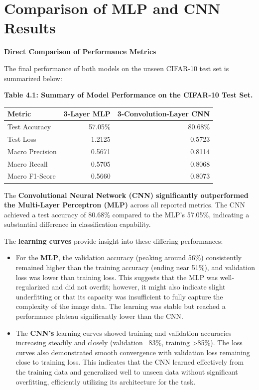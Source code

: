 \documentclass[12pt, a4paper]{report}
\begin{document}
\section{Comparison of MLP and CNN Results}
\noindent \textbf{Direct Comparison of Performance Metrics}

The final performance of both models on the unseen CIFAR-10 test set is summarized below:

\medskip %
\noindent\textbf{Table 4.1: Summary of Model Performance on the CIFAR-10 Test Set.}
\begin{center} %
\begin{tabular}{lrr}
\toprule
Metric & 3-Layer MLP & 3-Convolution-Layer CNN \\
\midrule
Test Accuracy   & 57.05\% & 80.68\% \\
Test Loss       & 1.2125  & 0.5723  \\
Macro Precision & 0.5671  & 0.8114  \\
Macro Recall    & 0.5705  & 0.8068  \\
Macro F1-Score  & 0.5660  & 0.8073  \\
\bottomrule
\end{tabular}
\end{center}
\medskip

The \textbf{Convolutional Neural Network (CNN) significantly outperformed the Multi-Layer Perceptron (MLP)} across all reported metrics.
The CNN achieved a test accuracy of 80.68\% compared to the MLP's 57.05\%, indicating a substantial difference in classification capability.

\noindent The \textbf{learning curves} provide insight into these differing performances:
\begin{itemize}
\item For the \textbf{MLP}, the validation accuracy (peaking around 56\%) consistently remained higher than the training accuracy (ending near 51\%), and validation loss was lower than training loss.
This suggests that the MLP was well-regularized and did not overfit;
however, it might also indicate slight underfitting or that its capacity was insufficient to fully capture the complexity of the image data.
The learning was stable but reached a performance plateau significantly lower than the CNN.

\item The \textbf{CNN's} learning curves showed training and validation accuracies increasing steadily and closely (validation ~83\%, training >85\%).
The loss curves also demonstrated smooth convergence with validation loss remaining close to training loss.
This indicates that the CNN learned effectively from the training data and generalized well to unseen data without significant overfitting, efficiently utilizing its architecture for the task.
\end{itemize}
\end{document}
